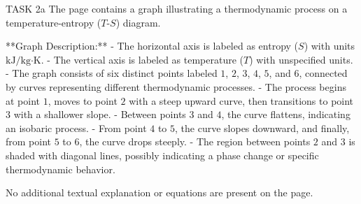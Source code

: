TASK 2a  
The page contains a graph illustrating a thermodynamic process on a temperature-entropy (\( T \)-\( S \)) diagram.  

**Graph Description:**  
- The horizontal axis is labeled as entropy (\( S \)) with units \( \text{kJ/kg·K} \).  
- The vertical axis is labeled as temperature (\( T \)) with unspecified units.  
- The graph consists of six distinct points labeled \( 1 \), \( 2 \), \( 3 \), \( 4 \), \( 5 \), and \( 6 \), connected by curves representing different thermodynamic processes.  
- The process begins at point \( 1 \), moves to point \( 2 \) with a steep upward curve, then transitions to point \( 3 \) with a shallower slope.  
- Between points \( 3 \) and \( 4 \), the curve flattens, indicating an isobaric process.  
- From point \( 4 \) to \( 5 \), the curve slopes downward, and finally, from point \( 5 \) to \( 6 \), the curve drops steeply.  
- The region between points \( 2 \) and \( 3 \) is shaded with diagonal lines, possibly indicating a phase change or specific thermodynamic behavior.  

No additional textual explanation or equations are present on the page.